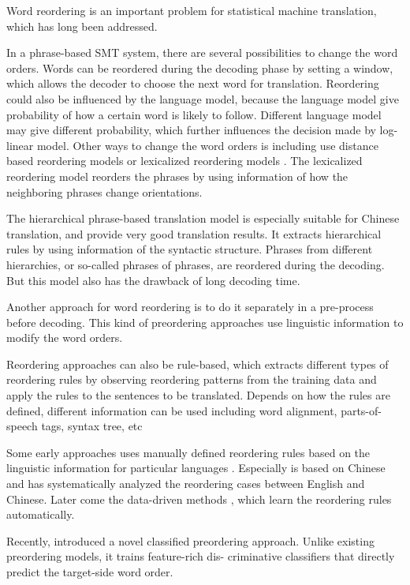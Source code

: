 Word reordering is an important problem for statistical machine translation, which has long been addressed.

In a phrase-based SMT system, there are several possibilities to change the word orders. Words can be reordered during the decoding phase by setting a window, which allows the decoder to choose the next word for translation. Reordering could also be influenced by the language model, because the language model give probability of how a certain word is likely to follow. Different language model may give different probability, which further influences the decision made by log-linear model. Other ways to change the word orders is including use distance based reordering models or lexicalized reordering models \citep{tillmann2004, koehn2005}. The lexicalized reordering model reorders the phrases by using information of how the neighboring phrases change orientations.

The hierarchical phrase-based translation model \citep{hier} is especially suitable for Chinese translation, and provide very good translation results. It extracts hierarchical rules by using information of the syntactic structure. Phrases from different hierarchies, or so-called phrases of phrases, are reordered during the decoding. But this model also has the drawback of long decoding time.

Another approach for word reordering is to do it separately in a pre-process before decoding. This kind of preordering approaches use linguistic information to modify the word orders. 

Reordering approaches can also be rule-based, which extracts different types of reordering rules by observing reordering patterns from the training data and apply the rules to the sentences to be translated. Depends on how the rules are defined, different information can be used including word alignment, parts-of-speech tags, syntax tree, etc

Some early approaches uses manually defined reordering rules based on the linguistic information for particular languages \citep{collins2005clause, popovic2006pos,habash2007syntactic}. Especially \cite{syntactic} is based on Chinese and has systematically analyzed the reordering cases between English and Chinese. Later come the data-driven methods \citep{zhang2007chunk, crego2008using}, which learn the reordering rules automatically. 

Recently, \cite{google} introduced a novel classified preordering approach. Unlike existing preordering models, it trains feature-rich dis-
criminative classifiers that directly predict the target-side word order.

